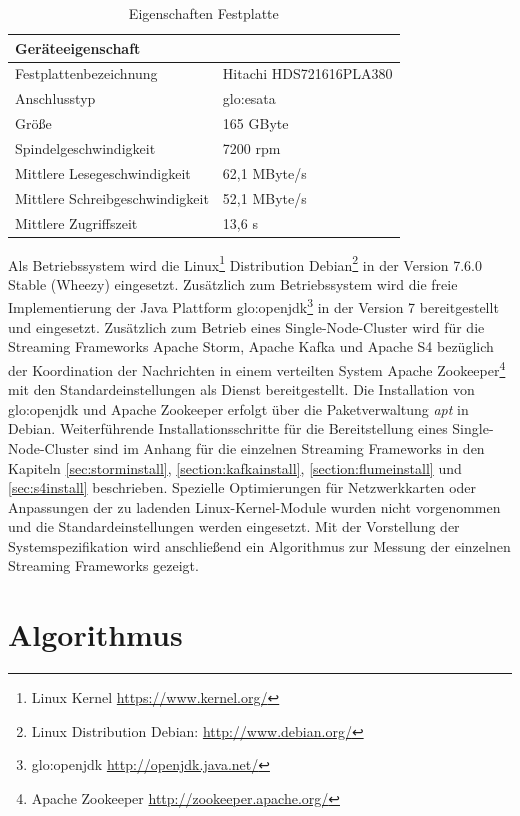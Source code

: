 \begin{table}[ht]
	\centering
		\begin{tabular}{@{}ll@{}} \toprule
			\textbf{Geräteeigenschaft} &  \\ \midrule
			Festplattenbezeichnung & Hitachi HDS721616PLA380 \\
			Anschlusstyp & \gls{glo:esata} \\
			Größe & 165 GByte \\
			Spindelgeschwindigkeit & 7200 rpm \\
			Mittlere Lesegeschwindigkeit & 62,1 MByte/s \\
			Mittlere Schreibgeschwindigkeit & 52,1 MByte/s \\
			Mittlere Zugriffszeit & 13,6 s \\
			\bottomrule			
		\end{tabular}
	\caption{Eigenschaften Festplatte}
	\label{tab:festplatte}
\end{table}

Als Betriebssystem wird die Linux\footnote{Linux Kernel \url{https://www.kernel.org/}} Distribution Debian\footnote{Linux Distribution Debian: \url{http://www.debian.org/}} in der Version 7.6.0 Stable (Wheezy) eingesetzt. Zusätzlich zum Betriebssystem wird die freie Implementierung der Java Plattform \gls{glo:openjdk}\footnote{\gls{glo:openjdk} \url{http://openjdk.java.net/}} in der Version 7 bereitgestellt und eingesetzt. Zusätzlich zum Betrieb eines Single-Node-Cluster wird für die Streaming Frameworks Apache Storm, Apache Kafka und Apache S4 bezüglich der Koordination der Nachrichten in einem verteilten System Apache Zookeeper\footnote{Apache Zookeeper \url{http://zookeeper.apache.org/}} mit den Standardeinstellungen als Dienst bereitgestellt. Die Installation von \gls{glo:openjdk} und Apache Zookeeper erfolgt über die Paketverwaltung \textit{apt} in Debian. Weiterführende Installationsschritte für die Bereitstellung eines Single-Node-Cluster sind im Anhang für die einzelnen Streaming Frameworks in den Kapiteln \ref{sec:storminstall}, \ref{section:kafkainstall}, \ref{section:flumeinstall} und \ref{sec:s4install} beschrieben. Spezielle Optimierungen für Netzwerkkarten oder Anpassungen der zu ladenden Linux-Kernel-Module wurden nicht vorgenommen und die Standardeinstellungen werden eingesetzt. Mit der Vorstellung der Systemspezifikation wird anschließend ein Algorithmus zur Messung der einzelnen Streaming Frameworks gezeigt.


\section{Algorithmus}
\label{sec:algorithmus}

